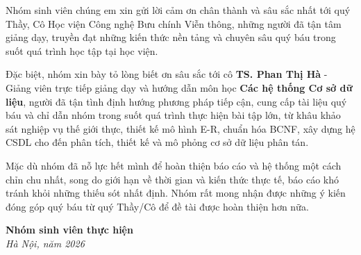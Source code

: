 \thispagestyle{plain}


\begin{flushleft}
Nhóm sinh viên chúng em xin gửi lời cảm ơn chân thành và sâu sắc nhất tới quý Thầy, Cô Học viện Công nghệ Bưu chính Viễn thông, những người đã tận tâm giảng dạy, truyền đạt những kiến thức nền tảng và chuyên sâu quý báu trong suốt quá trình học tập tại học viện.

\vspace{1em}

Đặc biệt, nhóm xin bày tỏ lòng biết ơn sâu sắc tới cô \textbf{TS. Phan Thị Hà} - Giảng viên trực tiếp giảng dạy và hướng dẫn môn học \textbf{Các hệ thống Cơ sở dữ liệu}, người đã tận tình định hướng phương pháp tiếp cận, cung cấp tài liệu quý báu và chỉ dẫn nhóm trong suốt quá trình thực hiện bài tập lớn, từ khâu khảo sát nghiệp vụ thế giới thực, thiết kế mô hình E-R, chuẩn hóa BCNF, xây dựng hệ CSDL cho đến phân tích, thiết kế và mô phỏng cơ sở dữ liệu phân tán.

\vspace{1em}

Mặc dù nhóm đã nỗ lực hết mình để hoàn thiện báo cáo và hệ thống một cách chỉn chu nhất, song do giới hạn về thời gian và kiến thức thực tế, báo cáo khó tránh khỏi những thiếu sót nhất định. Nhóm rất mong nhận được những ý kiến đóng góp quý báu từ quý Thầy/Cô để đề tài được hoàn thiện hơn nữa.

\vspace{1.5em}

\begin{flushright}
\textbf{Nhóm sinh viên thực hiện}\\
\textit{Hà Nội, năm 2026}
\end{flushright}
\end{flushleft}

